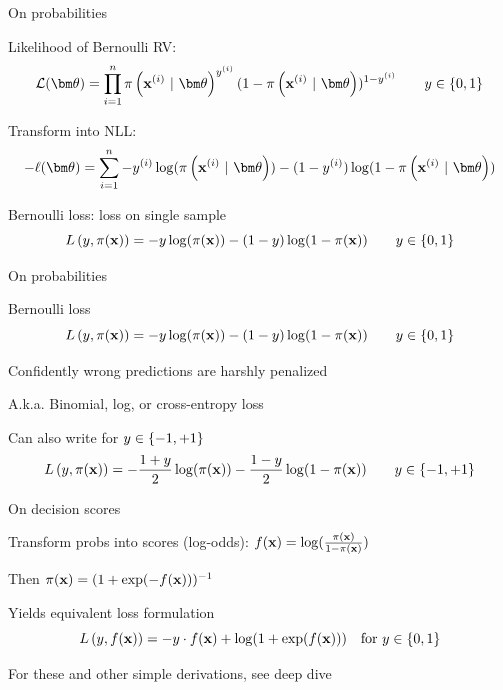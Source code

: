 \documentclass[11pt,compress,t,notes=noshow, xcolor=table]{beamer}
\begin{document}

\begin{framei}[sep=L]{On probabilities}

\item  Likelihood of Bernoulli RV:
$$
\LLt = \prodin \pixit^{\yi} (1-\pixit)^{1-\yi} \qquad  y \in \setzo
$$
\item Transform into NLL:
$$- \loglt = \sumin - \yi \log(\pixit) - (1-\yi)\log(1-\pixit)$$
\item Bernoulli loss: loss on single sample
$$
L\left(y, \pi(\mathbf{x})\right) = - y \log (\pi(\mathbf{x})) - (1 - y) \log (1 - \pi(\mathbf{x})) \qquad  y \in \{0, 1\} 
$$ 

\end{framei}


\begin{framei}[sep=S]{On probabilities}

\item Bernoulli loss
$$
L\left(y, \pi(\mathbf{x})\right) = - y \log (\pi(\mathbf{x})) - (1 - y) \log (1 - \pi(\mathbf{x})) \qquad y \in \{0, 1\} 
$$ 
\item Confidently wrong predictions are harshly penalized



\item A.k.a. Binomial, log, or cross-entropy loss
\item Can also write for $y \in \{-1, +1\} $
$$
L\left(y, \pi(\mathbf{x})\right)  = - \frac{1 + y}{2} \log(\pi(\mathbf{x})) - \frac{1 - y}{2} \log(1 - \pi(\mathbf{x})) \qquad y \in \{-1, +1\} 
$$

\end{framei}



\begin{framei}[sep=M]{On decision scores}

\item Transform probs into scores (log-odds): $f(\mathbf{x}) = \log(\frac{\pi(\mathbf{x})}{1 - \pi(\mathbf{x})})$
\item Then $\pi(\mathbf{x}) = (1 + \exp(-f(\mathbf{x})))^{-1}$
\item Yields equivalent loss formulation
$$L\left(y, f(\mathbf{x})\right) = - y \cdot f(\mathbf{x}) + \log(1 + \exp(f(\mathbf{x}))) \quad \text{for } y \in \{0, 1\}$$
\item For these and other simple derivations, see deep dive

\vfill


{}

\end{framei}
\end{document}
